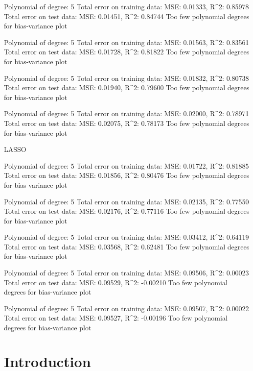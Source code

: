 \documentclass[a4paper, twocolumn]{article}
\begin{document}
Polynomial of degree:  5
Total error on training data:
MSE: 0.01333,  R^2: 0.85978
Total error on test data:
MSE: 0.01451,  R^2: 0.84744
Too few polynomial degrees for bias-variance plot

Polynomial of degree:  5
Total error on training data:
MSE: 0.01563,  R^2: 0.83561
Total error on test data:
MSE: 0.01728,  R^2: 0.81822
Too few polynomial degrees for bias-variance plot

Polynomial of degree:  5
Total error on training data:
MSE: 0.01832,  R^2: 0.80738
Total error on test data:
MSE: 0.01940,  R^2: 0.79600
Too few polynomial degrees for bias-variance plot

Polynomial of degree:  5
Total error on training data:
MSE: 0.02000,  R^2: 0.78971
Total error on test data:
MSE: 0.02075,  R^2: 0.78173
Too few polynomial degrees for bias-variance plot


LASSO

Polynomial of degree:  5
Total error on training data:
MSE: 0.01722,  R^2: 0.81885
Total error on test data:
MSE: 0.01856,  R^2: 0.80476
Too few polynomial degrees for bias-variance plot

Polynomial of degree:  5
Total error on training data:
MSE: 0.02135,  R^2: 0.77550
Total error on test data:
MSE: 0.02176,  R^2: 0.77116
Too few polynomial degrees for bias-variance plot

Polynomial of degree:  5
Total error on training data:
MSE: 0.03412,  R^2: 0.64119
Total error on test data:
MSE: 0.03568,  R^2: 0.62481
Too few polynomial degrees for bias-variance plot

Polynomial of degree:  5
Total error on training data:
MSE: 0.09506,  R^2: 0.00023
Total error on test data:
MSE: 0.09529,  R^2: -0.00210
Too few polynomial degrees for bias-variance plot

Polynomial of degree:  5
Total error on training data:
MSE: 0.09507,  R^2: 0.00022
Total error on test data:
MSE: 0.09527,  R^2: -0.00196
Too few polynomial degrees for bias-variance plot
\fi
\section{Introduction}
\end{document}
